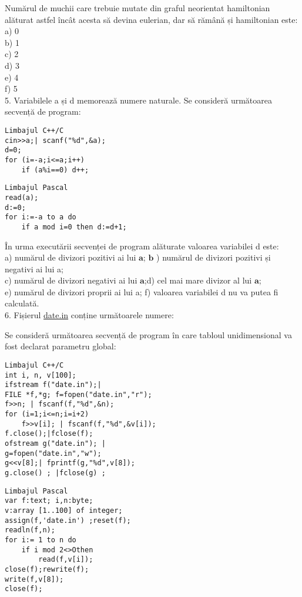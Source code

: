 Numărul de muchii care trebuie mutate din graful neorientat hamiltonian alăturat astfel încât acesta să devina eulerian, dar să rămână și hamiltonian este:\\
a) 0\\
b) 1\\
c) 2\\
d) 3\\
e) 4\\
f) 5\\
5. Variabilele a și d memorează numere naturale. Se consideră următoarea secvență de program:

\begin{verbatim}
Limbajul C++/C
cin>>a;| scanf("%d",&a);
d=0;
for (i=-a;i<=a;i++)
    if (a%i==0) d++;
\end{verbatim}

\begin{verbatim}
Limbajul Pascal
read(a);
d:=0;
for i:=-a to a do
    if a mod i=0 then d:=d+1;
\end{verbatim}

În urma executării secvenței de program alăturate valoarea variabilei d este:\\
a) numărul de divizori pozitivi ai lui $\mathbf{a}$; $\mathbf{b}$ ) numărul de divizori pozitivi și negativi ai lui a;\\
c) numărul de divizori negativi ai lui $\mathbf{a}$;d) cel mai mare divizor al lui $\mathbf{a}$;\\
e) numărul de divizori proprii ai lui a; f) valoarea variabilei d nu va putea fi calculată.\\
6. Fișierul \href{http://date.in}{date.in} conține următoarele numere:

Se consideră următoarea secvență de program în care tabloul unidimensional va fost declarat parametru global:

\begin{verbatim}
Limbajul C++/C
int i, n, v[100];
ifstream f("date.in");|
FILE *f,*g; f=fopen("date.in","r");
f>>n; | fscanf(f,"%d",&n);
for (i=1;i<=n;i=i+2)
    f>>v[i]; | fscanf(f,"%d",&v[i]);
f.close();|fclose(f);
ofstream g("date.in"); |
g=fopen("date.in","w");
g<<v[8];| fprintf(g,"%d",v[8]);
g.close() ; |fclose(g) ;
\end{verbatim}

\begin{verbatim}
Limbajul Pascal
var f:text; i,n:byte;
v:array [1..100] of integer;
assign(f,'date.in') ;reset(f);
readln(f,n);
for i:= 1 to n do
    if i mod 2<>Othen
        read(f,v[i]);
close(f);rewrite(f);
write(f,v[8]);
close(f);
\end{verbatim}

